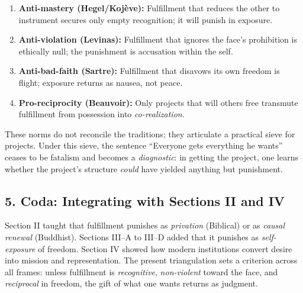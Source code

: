 \documentclass[12pt]{article}
\begin{document}
\begin{enumerate}
	\item \textbf{Anti-mastery (Hegel/Koj{\`e}ve):} Fulfillment that reduces the other to instrument secures only empty recognition; it will punish in exposure.
	\item \textbf{Anti-violation (Levinas):} Fulfillment that ignores the face’s prohibition is ethically null; the punishment is accusation within the self.
	\item \textbf{Anti-bad-faith (Sartre):} Fulfillment that disavows its own freedom is flight; exposure returns as nausea, not peace.
	\item \textbf{Pro-reciprocity (Beauvoir):} Only projects that will others free transmute fulfillment from possession into \emph{co-realization}.
\end{enumerate}

These norms do not reconcile the traditions; they articulate a practical sieve for projects. Under this sieve, the sentence “Everyone gets everything he wants” ceases to be fatalism and becomes a \emph{diagnostic}: in getting the project, one learns whether the project’s structure \emph{could} have yielded anything but punishment.

\subsection*{5. Coda: Integrating with Sections II and IV}
Section II taught that fulfillment punishes as \emph{privation} (Biblical) or as \emph{causal renewal} (Buddhist). Sections III--A to III--D added that it punishes as \emph{self-exposure} of freedom. Section IV showed how modern institutions convert desire into mission and representation. The present triangulation sets a criterion across all frames: unless fulfillment is \emph{recognitive}, \emph{non-violent} toward the face, and \emph{reciprocal} in freedom, the gift of what one wants returns as judgment.

\printbibliography
\end{document}
